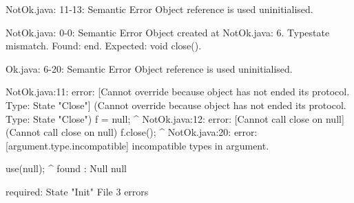 \lstset{language=,caption=Mungo's output}
\begin{code}

NotOk.java: 11-13: Semantic Error
		Object reference is used uninitialised.

NotOk.java: 0-0: Semantic Error
		Object created at NotOk.java: 6. Typestate mismatch. Found: end. Expected: void close().

Ok.java: 6-20: Semantic Error
		Object reference is used uninitialised.
\end{code}

\lstset{language=,caption=Our tool's output}
\begin{code}
NotOk.java:11: error: [Cannot override because object has not ended its protocol. Type: State "Close"] (Cannot override because object has not ended its protocol. Type: State "Close")
        f = null;
        ^
NotOk.java:12: error: [Cannot call close on null] (Cannot call close on null)
        f.close();
               ^
NotOk.java:20: error: [argument.type.incompatible] incompatible types in argument.

    use(null);
        ^
  found   : Null null

  required: State "Init" File
3 errors
\end{code}

